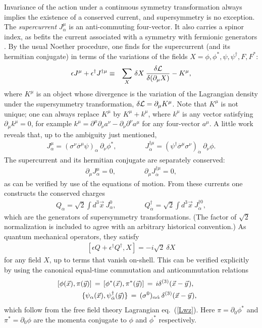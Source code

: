\documentclass[11pt]{article}
\def\beq{\begin{eqnarray}}
\def\eeq{\end{eqnarray}}
\def\lagr{{\cal L}}
\def\sigmabar{\overline\sigma}
\begin{document}
Invariance of the action under a continuous symmetry transformation always implies
the existence of a conserved current, and supersymmetry is no exception.
The {\it supercurrent} $J^\mu_\alpha$ is an anti-commuting four-vector. It
also carries a spinor index, as befits the current associated with a
symmetry with fermionic generators \cite{ref:supercurrent}. By the usual
Noether procedure, one finds for the supercurrent (and its hermitian
conjugate) in terms of the variations of the fields
$X=\phi,\phi^*,\psi,\psi^\dagger,F,F^*$: 
\beq
\epsilon J^\mu + \epsilon^\dagger J^{\dagger\mu}
&\equiv & 
\sum_X \, \delta X\>{\delta\lagr\over \delta(\partial_\mu X)} 
- K^\mu ,
\label{Noether}
\eeq
where $K^\mu$ is an object whose divergence is the variation of the
Lagrangian density under the supersymmetry transformation, $\delta \lagr =
\partial_\mu K^\mu$. Note that $K^\mu$ is not unique; one can always
replace $K^\mu$ by $K^\mu + k^\mu$, where $k^\mu$ is any vector satisfying
$\partial_\mu k^\mu=0$, for example $k^\mu = \partial^\mu \partial_\nu
a^\nu - \partial_\nu\partial^\nu a^\mu$ for any four-vector $a^\mu$. 
A little work reveals that, up to
the ambiguity just mentioned,
\beq
J^\mu_\alpha = (\sigma^\nu\sigmabar^\mu\psi)_\alpha\> \partial_\nu \phi^*
, \qquad\qquad
J^{\dagger\mu}_{\dot{\alpha}}
=  (\psi^\dagger \sigmabar^\mu \sigma^\nu)_{\dot{\alpha}}
\> \partial_\nu \phi .
\label{WZsupercurrent}
\eeq
The supercurrent and its hermitian conjugate are separately conserved:
\beq
\partial_\mu J^\mu_\alpha = 0,\qquad\qquad
\partial_\mu J^{\dagger\mu}_{\dot{\alpha}} = 0 ,
\eeq
as can be verified by use of the equations of motion. From these currents
one constructs the conserved charges
\beq
Q_\alpha = {\sqrt{2}}\int d^3 \vec{x}\> J^0_\alpha,\qquad\qquad
Q^\dagger_{\dot{\alpha}} = {\sqrt{2}} \int d^3\vec{x} \> 
J^{\dagger 0}_{\dot{\alpha}} ,
\eeq
which are the generators of supersymmetry transformations. (The factor of
$\sqrt{2}$ normalization is included to agree with an arbitrary historical
convention.) As quantum mechanical operators, they satisfy
\beq
\left [ \epsilon Q + \epsilon^\dagger Q^\dagger , X \right ]
= -i{\sqrt{2}} \> \delta X
\label{interpolistheworstbandonearth}
\eeq
for any field $X$, up to terms that vanish on-shell. This
can be verified explicitly by using the canonical equal-time
commutation and anticommutation relations
\beq
&&[ \phi(\vec{x}), \pi(\vec{y}) ] \,=\,
[ \phi^*(\vec{x}), \pi^*(\vec{y}) ] \,=\, i \delta^{(3)}(\vec{x}-\vec{y}
\hspace{0.25mm}) , \qquad\>\>{}\\
&&
\{ 
\psi_\alpha (\vec{x}), 
\psi^\dagger_{\dot{\alpha}} (\vec{y}) \} \,=\,
(\sigma^0)_{{\alpha}\dot{\alpha}}\,\delta^{(3)}(\vec{x}-\vec{y}
\hspace{0.25mm} ), \qquad{}
\eeq
which follow from the free field theory Lagrangian eq.~(\ref{Lwz}). Here $\pi =
\partial_0 \phi^*$ and $\pi^* = \partial_0 \phi$ are the momenta conjugate
to $\phi$ and $\phi^*$ respectively.
\end{document}
